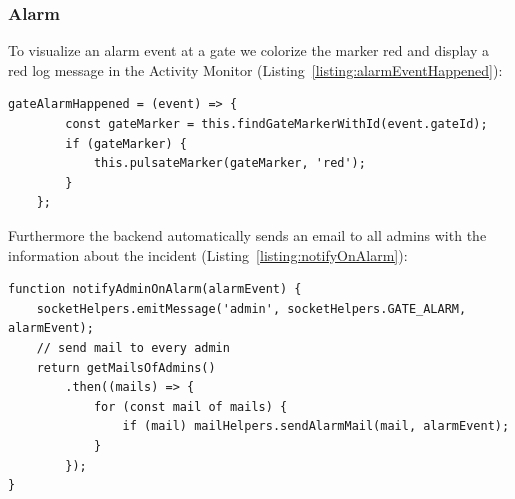 \subsubsection{Alarm}

To visualize an alarm event at a gate we colorize the marker red and display a red log message in the Activity Monitor (Listing~\ref{listing:alarmEventHappened}):

\begin{lstlisting}[label={listing:alarmEventHappened},caption={Handling gate alarm events in frontend}]
gateAlarmHappened = (event) => {
        const gateMarker = this.findGateMarkerWithId(event.gateId);
        if (gateMarker) {
            this.pulsateMarker(gateMarker, 'red');
        }
    };
\end{lstlisting}

Furthermore the backend automatically sends an email to all admins with the information about the incident (Listing~\ref{listing:notifyOnAlarm}):

\begin{lstlisting}[label={listing:notifyOnAlarm},caption={Notifying admins on alarm event}]
function notifyAdminOnAlarm(alarmEvent) {
    socketHelpers.emitMessage('admin', socketHelpers.GATE_ALARM, alarmEvent);
    // send mail to every admin
    return getMailsOfAdmins()
        .then((mails) => {
            for (const mail of mails) {
                if (mail) mailHelpers.sendAlarmMail(mail, alarmEvent);
            }
        });
}
\end{lstlisting}

\clearpage

